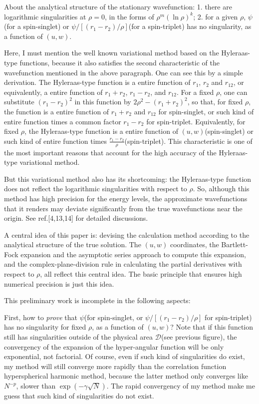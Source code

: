 About the analytical structure of the stationary wavefunction:
1. there are logarithmic singularities at $\rho=0$, in the forms
of $\rho^{m}(\ln\rho)^{k}$; 2. for a given $\rho$, $\psi$ (for a spin-singlet)
or $\psi/[(r_{1}-r_{2})/\rho]$(for a spin-triplet) has no singularity,
as a function of $(u,w)$.

Here, I must mention the well known variational method based on
the Hyleraas-type functions, because it also
satisfies the second characteristic of
the wavefunction mentioned in the above paragraph.
One can see this by
a simple derivation. The Hyleraas-type function is a entire function
of $r_1$, $r_2$ and $r_{12}$, or equivalently, a entire function
of $r_{1}+r_{2}$, $r_{1}-r_{2}$, and $r_{12}$. For a fixed $\rho$,
one can substitute $(r_{1}-r_{2})^2$ in this function by
$2\rho^{2}-(r_{1}+r_{2})^{2}$, so that, for fixed $\rho$,
the function is a entire function
of $r_{1}+r_{2}$ and $r_{12}$ for spin-singlet, or such kind of entire
function times a common factor $r_{1}-r_{2}$ for spin-triplet. Equivalently,
for fixed $\rho$, the Hyleraas-type function is a entire function of
$(u,w)$(spin-singlet) or such kind of entire function times
$\frac{r_{1}-r_{2}}{\rho}$(spin-triplet).
This characteristic is one of the most important reasons that
account for the high accuracy of the Hyleraas-type variational method.

But this variational method also has its shortcoming: the Hyleraas-type
function does not reflect the logarithmic singularities with respect to
$\rho$. So, although this method has high precision for the energy levels,
the approximate wavefunctions that it renders may deviate significantly
from the true wavefunctions near the origin. See ref.[4,13,14] for detailed
discussions.

A central idea of this paper is: devising the calculation method
according to the analytical structure of the true solution. The $(u,w)$
coordinates, the Bartlett-Fock expansion and the asymptotic series approach
to compute this expansion, and the complex-plane-division rule in calculating
the partial derivatives with respect to $\rho$, all reflect this central
idea. The basic principle that ensures high numerical precision is just
this idea.

This preliminary work is incomplete in the following aspects:

First, how to \emph{prove} that $\psi$(for spin-singlet, or 
$\psi/[(r_{1}-r_{2})/\rho]$ for spin-triplet) has no singularity for fixed $\rho$,
as a function of $(u,w)$? Note that if this function still has singularities outside
of the physical area $\mathcal{D}$(see previous figure), the convergency of
the expansion of the hyper-angular function
will be only exponential, not factorial. Of course, even if
such kind of singularities do exist, my method will still converge more rapidly
than the correlation function hyperspherical harmonic method, because the latter
method only converges like $N^{-p}$, slower than $\exp(-\gamma\sqrt{N})$.
The rapid convergency of my method make me guess that such kind of singularities
do not exist.


